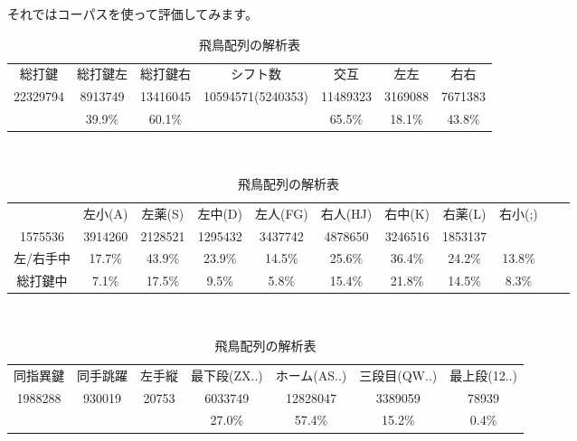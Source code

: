 それではコーパスを使って評価してみます。

\begin{table}[htbp]
 \caption{飛鳥配列の解析表}
 \begin{center}
 \begin{tabular}{cccc|ccc}
 \hline
総打鍵 & 総打鍵左 & 総打鍵右 & シフト数 & 交互 & 左左 & 右右 \\
22329794 & 8913749 & 13416045 & 10594571(5240353) & 11489323 & 3169088 & 7671383\\
 & 39.9\% & 60.1\% &  & 65.5\% & 18.1\% & 43.8\%\\
 \hline
 \end{tabular}

 　\vspace{1zw}　

 \begin{tabular}{ccccccccccc}
 \hline
& 左小(A) & 左薬(S) & 左中(D) & 左人(FG) & 右人(HJ) & 右中(K) & 右薬(L) & 右小(;)\\
1575536 & 3914260 & 2128521 & 1295432 & 3437742 & 4878650 & 3246516 & 1853137\\
左/右手中 &17.7\% & 43.9\% & 23.9\% & 14.5\% & 25.6\% & 36.4\% & 24.2\% & 13.8\%\\
総打鍵中 & 7.1\% & 17.5\% & 9.5\% & 5.8\% & 15.4\% & 21.8\% & 14.5\% & 8.3\%\\
\hline
 \end{tabular}

 　\vspace{1zw}　

 \begin{tabular}{ccc|cccc}
 \hline
 同指異鍵 & 同手跳躍 & 左手縦 & 最下段(ZX..) & ホーム(AS..) & 三段目(QW..) & 最上段(12..)\\
1988288 & 930019 & 20753 & 6033749 & 12828047 & 3389059 & 78939\\
 &  &  & 27.0\% & 57.4\% & 15.2\% & 0.4\%\\
\hline
 \end{tabular}
 \end{center}
 \label{tbl:asuka}
\end{table}


